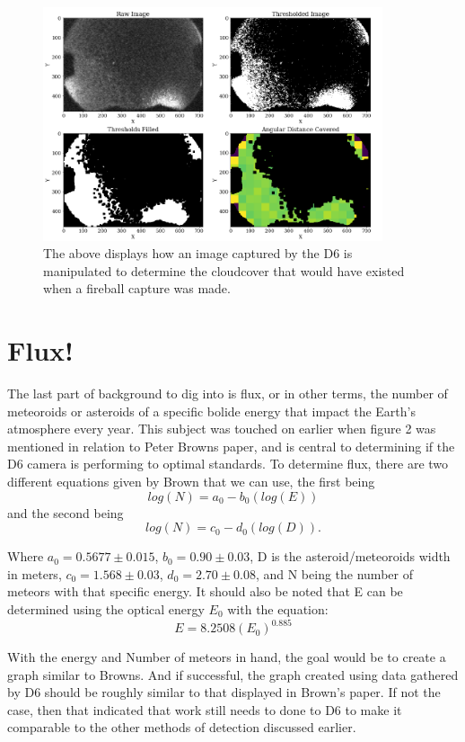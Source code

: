 \begin{figure}
    \centering
    \includegraphics[width=10cm]{Cloud-Threshold.png}
    \caption{The above displays how an image captured by the D6 is manipulated to determine the cloudcover that would have existed when a fireball capture was made.}
    \label{Figure 8}
\end{figure}

\section{Flux!}
The last part of background to dig into is flux, or in other terms, the number of meteoroids or asteroids of a specific bolide energy that impact the Earth's atmosphere every year\cite{PBrown2002}.
This subject was touched on earlier when figure 2 was mentioned in relation to Peter Browns paper, and is central to determining if the D6 camera is performing to optimal standards.
To determine flux, there are two different equations given by Brown that we can use, the first being
\begin{equation}
    log(N) = a_0-b_0(log(E))
\end{equation}
and the second being
\begin{equation}
    log(N) = c_0-d_0(log(D)).
\end{equation}

Where $a_0=0.5677\pm0.015$, $b_0=0.90\pm0.03$, D is the asteroid/meteoroids width in meters, $c_0=1.568\pm0.03$, $d_0=2.70\pm0.08$, and N being the number of meteors with that specific energy.
It should also be noted that E can be determined using the optical energy $E_0$ with the equation\cite{PBrown2002}:
\begin{equation}
    E = 8.2508(E_0)^0.885
\end{equation}

With the energy and Number of meteors in hand, the goal would be to create a graph similar to Browns. And if successful, the graph created using data gathered by D6 should be roughly similar to that displayed in Brown's paper.
If not the case, then that indicated that work still needs to done to D6 to make it comparable to the other methods of detection discussed earlier.

